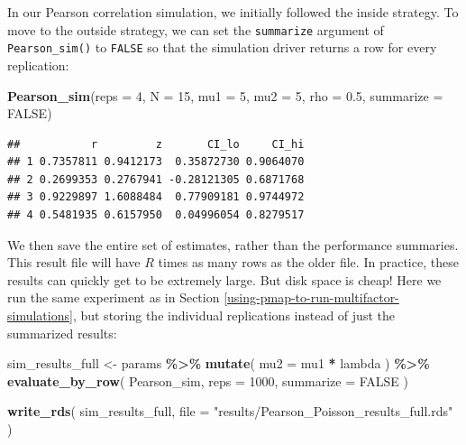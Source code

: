 \documentclass[
]{book}
\newenvironment{Shaded}{\begin{snugshade}}{\end{snugshade}}
\newcommand{\AttributeTok}[1]{\textcolor[rgb]{0.13,0.29,0.53}{#1}}
\newcommand{\ConstantTok}[1]{\textcolor[rgb]{0.56,0.35,0.01}{#1}}
\newcommand{\DecValTok}[1]{\textcolor[rgb]{0.00,0.00,0.81}{#1}}
\newcommand{\FloatTok}[1]{\textcolor[rgb]{0.00,0.00,0.81}{#1}}
\newcommand{\FunctionTok}[1]{\textcolor[rgb]{0.13,0.29,0.53}{\textbf{#1}}}
\newcommand{\NormalTok}[1]{#1}
\newcommand{\OtherTok}[1]{\textcolor[rgb]{0.56,0.35,0.01}{#1}}
\newcommand{\SpecialCharTok}[1]{\textcolor[rgb]{0.81,0.36,0.00}{\textbf{#1}}}
\newcommand{\StringTok}[1]{\textcolor[rgb]{0.31,0.60,0.02}{#1}}
\begin{document}
In our Pearson correlation simulation, we initially followed the inside strategy. To move to the outside strategy, we can set the \texttt{summarize} argument of \texttt{Pearson\_sim()} to \texttt{FALSE} so that the simulation driver returns a row for every replication:

\begin{Shaded}
\begin{Highlighting}[]
\FunctionTok{Pearson\_sim}\NormalTok{(}\AttributeTok{reps =} \DecValTok{4}\NormalTok{, }\AttributeTok{N =} \DecValTok{15}\NormalTok{, }\AttributeTok{mu1 =} \DecValTok{5}\NormalTok{, }\AttributeTok{mu2 =} \DecValTok{5}\NormalTok{, }\AttributeTok{rho =} \FloatTok{0.5}\NormalTok{, }\AttributeTok{summarize =} \ConstantTok{FALSE}\NormalTok{)}
\end{Highlighting}
\end{Shaded}

\begin{verbatim}
##           r         z       CI_lo     CI_hi
## 1 0.7357811 0.9412173  0.35872730 0.9064070
## 2 0.2699353 0.2767941 -0.28121305 0.6871768
## 3 0.9229897 1.6088484  0.77909181 0.9744972
## 4 0.5481935 0.6157950  0.04996054 0.8279517
\end{verbatim}

We then save the entire set of estimates, rather than the performance summaries.
This result file will have \(R\) times as many rows as the older file. In practice, these results can quickly get to be extremely large.
But disk space is cheap!
Here we run the same experiment as in Section \ref{using-pmap-to-run-multifactor-simulations}, but storing the individual replications instead of just the summarized results:

\begin{Shaded}
\begin{Highlighting}[]
\NormalTok{sim\_results\_full }\OtherTok{\textless{}{-}} 
\NormalTok{  params }\SpecialCharTok{\%\textgreater{}\%}
  \FunctionTok{mutate}\NormalTok{( }\AttributeTok{mu2 =}\NormalTok{ mu1 }\SpecialCharTok{*}\NormalTok{ lambda ) }\SpecialCharTok{\%\textgreater{}\%}
  \FunctionTok{evaluate\_by\_row}\NormalTok{( Pearson\_sim, }\AttributeTok{reps =} \DecValTok{1000}\NormalTok{, }\AttributeTok{summarize =} \ConstantTok{FALSE}\NormalTok{ )}

\FunctionTok{write\_rds}\NormalTok{( sim\_results\_full, }\AttributeTok{file =} \StringTok{"results/Pearson\_Poisson\_results\_full.rds"}\NormalTok{ )}
\end{Highlighting}
\end{Shaded}
\end{document}
